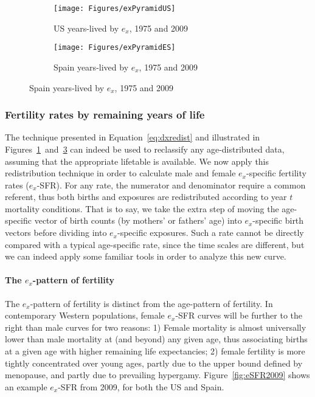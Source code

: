 \begin{figure}
        \centering
        \begin{subfigure}
                \centering
                \caption{US years-lived by $e_x$, 1975 and 2009}
                \texttt{[image: Figures/exPyramidUS]}
                \label{fig:exPyrUS}
        \end{subfigure}
        \begin{subfigure}
                \centering
                \caption{Spain years-lived by $e_x$, 1975 and 2009}
                \texttt{[image: Figures/exPyramidES]}
               
                \label{fig:exPyrES}
        \end{subfigure}
\end{figure}

\subsubsection{Fertility rates by remaining years of life}
The technique presented in Equation~\ref{eq:dxredist} and illustrated in
Figures~\ref{fig:exPyrUS}~and~\ref{fig:exPyrES} can indeed be used to reclassify
any age-distributed data, assuming that the appropriate lifetable is available.
We now apply this redistribution technique in order to calculate male and 
female $e_x$-specific fertility rates ($e_x$-SFR). For any rate, the numerator 
and denominator require a common referent, thus both births and exposures are 
redistributed according to year $t$ mortality conditions. That
is to say, we take the extra step of moving the age-specific vector
of birth counts (by mothers' or fathers' age) into $e_x$-specific birth
vectors before dividing into  $e_x$-specific exposures. Such a rate cannot be
directly compared with a typical age-specific rate, since the time scales are different, but we 
can indeed apply some familiar tools in order to analyze this new curve.

\paragraph{The $e_x$-pattern of fertility}

The $e_x$-pattern of fertility is distinct from the age-pattern of fertility. 
In contemporary Western populations, female $e_x$-SFR curves will be
further to the right than male curves for two reasons: 1) Female mortality is
almost universally lower than male mortality at (and beyond) any given age,
thus associating births at a given age with higher remaining life expectancies; 2)
female fertility is more tightly concentrated over young ages, partly due to the
upper bound defined by menopause, and partly due to prevailing hypergamy.
Figure~\ref{fig:eSFR2009} shows an example $e_x$-SFR from 2009, for both the US and Spain.

